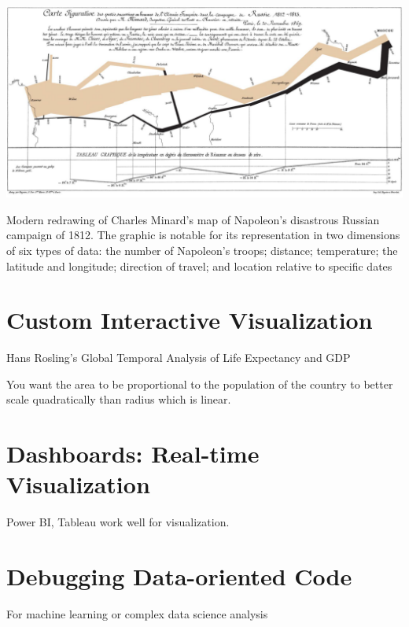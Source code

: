 \documentclass[11pt]{article}
\theoremstyle{definition}
\begin{document}
\includegraphics[width=\textwidth]{37.png}

Modern redrawing of Charles Minard's map of Napoleon's disastrous Russian campaign of
1812. The graphic is notable for its representation in two dimensions of six types of data: the
number of Napoleon's troops; distance; temperature; the latitude and longitude; direction of
travel; and location relative to specific dates

\section{Custom Interactive Visualization}
Hans Rosling's Global Temporal Analysis of Life Expectancy and GDP

You want the area to be proportional to the population of the country to better scale quadratically than radius which is linear. 

\section{Dashboards: Real-time Visualization}

Power BI, Tableau work well for visualization.

\section{Debugging
Data-oriented Code}
For machine learning or complex
data science analysis
\end{document}
